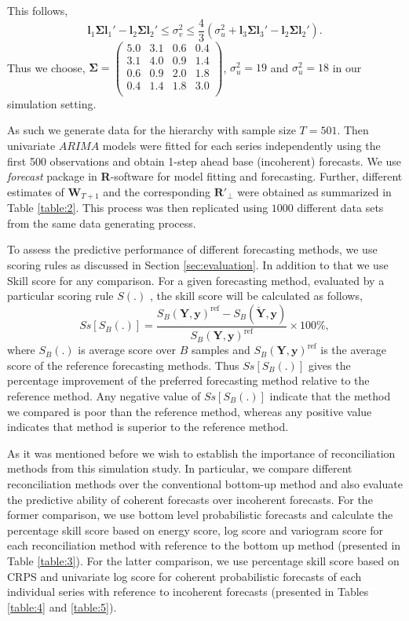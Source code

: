 \documentclass[a4paper, 11pt]{article}
\begin{document}
This follows,
$$\bm{l}_1\bm{\Sigma} \bm{l}_1' - \bm{l}_2\bm{\Sigma} \bm{l}_2' \le \sigma^2_v \le \frac{4}{3}(\sigma^2_u + \bm{l}_3\bm{\Sigma} \bm{l}_3' - \bm{l}_2\bm{\Sigma} \bm{l}_2').$$
Thus we choose,
$\bm{\Sigma} =
\begin{pmatrix}
5.0 & 3.1 & 0.6 & 0.4 \\
3.1 & 4.0 & 0.9 & 1.4 \\
0.6 & 0.9 & 2.0 & 1.8 \\
0.4 & 1.4 & 1.8 & 3.0 \\
\end{pmatrix}$,
$\sigma^2_u = 19$ and $\sigma^2_u = 18$ in our simulation setting.

As such we generate data for the hierarchy with sample size $T=501$. Then univariate $ARIMA$ models were fitted for each series independently using the first 500 observations and obtain 1-step ahead base (incoherent) forecasts. We use \textit{forecast} package in \textbf{R}-software \citet{hyndman2017forecasting} for model fitting and forecasting. Further, different estimates of $\bm{W}_{T+1}$ and the corresponding $\bm{R}'_\bot$ were obtained as summarized in Table \ref{table:2}. This process was then replicated using $1000$ different data sets from the same data generating process.

To assess the predictive performance of different forecasting methods, we use scoring rules as discussed in Section \ref{sec:evaluation}. In addition to that we use Skill score \citep{Gneiting2007} for any comparison. For a given forecasting method, evaluated by a particular scoring rule $S(.)$ , the skill score will be calculated as follows,
\begin{equation}
Ss[S_B(.)] = \frac{S_B(\bm{Y},\bm{y})^{\text{ref}} - S_B(\breve{\bm{Y}},\bm{y})}{S_B(\bm{Y},\bm{y})^{\text{ref}}}\times 100\%,
\end{equation}
where $S_B(.)$ is average score over $B$ samples and $S_B(\bm{Y},\bm{y})^{\text{ref}}$ is the average score of the reference forecasting methods. Thus $Ss[S_B(.)]$ gives the percentage improvement of the preferred forecasting method relative to the reference method. Any negative value of $Ss[S_B(.)]$ indicate that the method we compared is poor than the reference method, whereas any positive value indicates that method is superior to the reference method.

As it was mentioned before we wish to establish the importance of reconciliation methods from this simulation study. In particular, we compare different reconciliation methods over the conventional bottom-up method and also evaluate the predictive ability of coherent forecasts over incoherent forecasts. For the former comparison, we use bottom level probabilistic forecasts and calculate the percentage skill score based on energy score, log score and variogram score for each reconciliation method with reference to the bottom up method (presented in Table \ref{table:3}). For the latter comparison, we use percentage skill score based on CRPS and univariate log score for coherent probabilistic forecasts of each individual series with reference to incoherent forecasts (presented in Tables \ref{table:4} and \ref{table:5}).
\end{document}
